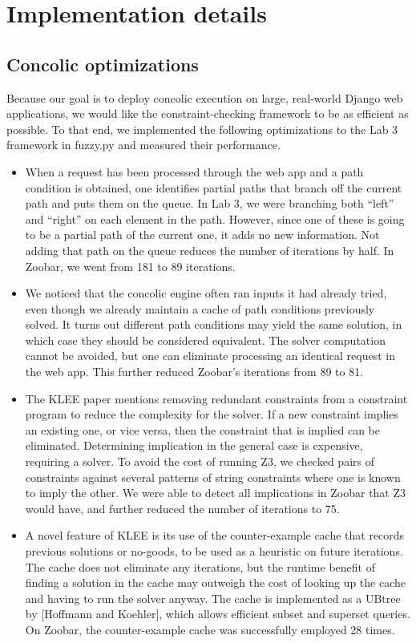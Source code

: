 \documentclass{scrartcl}
\begin{document}
\section{Implementation details}

\subsection{Concolic optimizations}
Because our goal is to deploy concolic execution on large, real-world
Django web applications, we would like the constraint-checking framework
to be as efficient as possible. To that end, we implemented the
following optimizations to the Lab 3 framework in fuzzy.py and measured
their performance.

\begin{itemize}
\item When a request has been processed through the web app and a path
  condition is obtained, one identifies partial paths that branch off the
  current path and puts them on the queue. In Lab 3, we were branching
  both ``left'' and ``right'' on each element in the path. However, since
  one of these is going to be a partial path of the current one, it adds
  no new information. Not adding that path on the queue reduces the number
  of iterations by half. In Zoobar, we went from 181 to 89 iterations.

\item We noticed that the concolic engine often ran inputs it had
  already tried, even though we already maintain a cache of path
  conditions previously solved. It turns out different path conditions
  may yield the same solution, in which case they should be considered
  equivalent. The solver computation cannot be avoided, but one can
  eliminate processing an identical request in the web app. This further
  reduced Zoobar's iterations from 89 to 81.

\item The KLEE paper mentions removing redundant constraints from a
  constraint program to reduce the complexity for the solver. If a new
  constraint implies an existing one, or vice versa, then the constraint
  that is implied can be eliminated.
  Determining implication in the general case is expensive, requiring a
  solver. To avoid the cost of running Z3, we checked pairs of constraints
  against several patterns of string constraints where one is known to
  imply the other. We were able to detect all implications in Zoobar that
  Z3 would have, and further reduced the number of iterations to 75.

\item A novel feature of KLEE is its use of the counter-example cache
  that records previous solutions or no-goods, to be used as a heuristic
  on future iterations. The cache does not eliminate any iterations, but
  the runtime benefit of finding a solution in the cache may outweigh the
  cost of looking up the cache and having to run the solver anyway.
  The cache is implemented as a UBtree by [Hoffmann and Koehler],
  which allows efficient subset and superset queries. On Zoobar, the
  counter-example cache was successfully employed 28 times.
\end{itemize}
\end{document}
